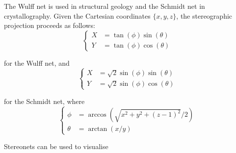 The Wulff net is used in structural geology and the Schmidt net in
crystallography. Given the Cartesian coordinates $\{x,y,z\}$, the
stereographic projection proceeds as follows:
\begin{equation}
  \left\{
  \begin{split}
    X & = \tan(\phi) \sin(\theta) \\
    Y & = \tan(\phi) \cos(\theta)
  \end{split}
  \right.
\end{equation}

\noindent for the Wulff net, and 
\begin{equation}
  \left\{
  \begin{split}
    X & = \sqrt{2}\sin(\phi)\sin(\theta) \\
    Y & = \sqrt{2}\sin(\phi)\cos(\theta)
  \end{split}
  \right.
\end{equation}

\noindent for the Schmidt net, where
\begin{equation}
  \left\{
  \begin{split}
    \phi & = \arccos\left(\sqrt{{x^2+y^2+(z-1)^2}}/{2}\right) \\
    \theta & = \arctan\left({x}/{y}\right)
  \end{split}
  \right.
\end{equation}

Stereonets can be used to visualise

